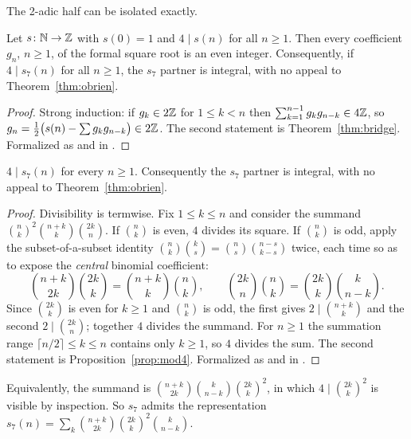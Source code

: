The 2-adic half can be isolated exactly.

\begin{proposition}[status (K)]\label{prop:mod4}
Let $s\colon\mathbb N\to\mathbb{Z}$ with $s(0)=1$ and $4\mid s(n)$ for all $n\geq1$. Then
every coefficient $g_n$, $n\geq1$, of the formal square root is an even integer.
Consequently, if $4\mid s_7(n)$ for all $n\geq1$, the $s_7$ partner is integral,
with no appeal to Theorem~\ref{thm:obrien}.
\end{proposition}

\begin{proof}
Strong induction: if $g_k\in2\mathbb{Z}$ for $1\le k<n$ then
$\sum_{k=1}^{n-1}g_kg_{n-k}\in4\mathbb{Z}$, so
$g_n=\tfrac12\bigl(s(n)-\sum g_kg_{n-k}\bigr)\in2\mathbb{Z}$. The second statement is
Theorem~\ref{thm:bridge}. Formalized as 
and  in
.
\end{proof}

\begin{theorem}[status (K)]\label{thm:mod4}
$4\mid s_7(n)$ for every $n\geq1$. Consequently the $s_7$ partner is integral,
with no appeal to Theorem~\ref{thm:obrien}.
\end{theorem}

\begin{proof}
Divisibility is termwise. Fix $1\le k\le n$ and consider the summand
$\binom nk^2\binom{n+k}k\binom{2k}n$. If $\binom nk$ is even, $4$ divides its
square. If $\binom nk$ is odd, apply the subset-of-a-subset identity
$\binom nk\binom ks=\binom ns\binom{n-s}{k-s}$ twice, each time so as to expose
the \emph{central} binomial coefficient:
\[
  \binom{n+k}{2k}\binom{2k}{k} = \binom{n+k}{k}\binom nk,
  \qquad
  \binom{2k}{n}\binom nk = \binom{2k}{k}\binom{k}{n-k}.
\]
Since $\binom{2k}k$ is even for $k\ge1$ and $\binom nk$ is odd, the first gives
$2\mid\binom{n+k}k$ and the second $2\mid\binom{2k}n$; together $4$ divides the
summand. For $n\ge1$ the summation range $\lceil n/2\rceil\le k\le n$ contains
only $k\ge1$, so $4$ divides the sum. The second statement is
Proposition~\ref{prop:mod4}. Formalized as  and
 in
.
\end{proof}

Equivalently, the summand is $\binom{n+k}{2k}\binom k{n-k}\binom{2k}k^2$, in
which $4\mid\binom{2k}k^2$ is visible by inspection. So $s_7$ admits the
representation
$s_7(n)=\sum_k\binom{n+k}{2k}\binom{2k}{k}^2\binom{k}{n-k}$.

